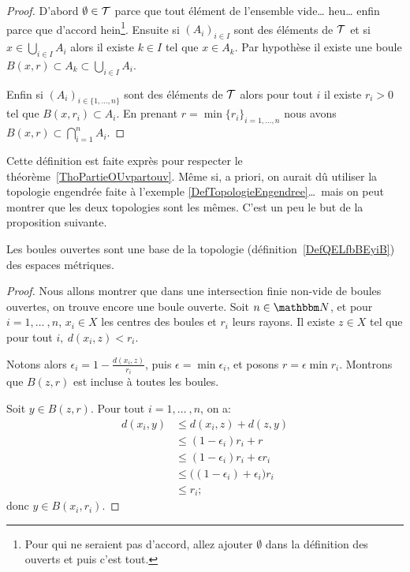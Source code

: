 \begin{proof}
    D'abord \( \emptyset\in\mathcal{T}\) parce que tout élément de l'ensemble vide\dots{} heu\dots{} enfin parce que d'accord hein\footnote{Pour qui ne seraient pas d'accord, allez ajouter \( \emptyset\) dans la définition des ouverts et puis c'est tout.}. Ensuite si \( (A_i)_{i\in I}\) sont des éléments de \( \mathcal{T}\) et si \( x\in\bigcup_{i\in I}A_i\) alors il existe \( k\in I\) tel que \( x\in A_k\). Par hypothèse il existe une boule \( B(x,r)\subset A_k\subset\bigcup_{i\in I}A_i\).

    Enfin si \( (A_i)_{i\in\{ 1,\ldots, n \}}\) sont des éléments de \( \mathcal{T}\) alors pour tout \( i\) il existe \( r_i>0\) tel que \( B(x,r_i)\subset A_i\). En prenant \( r=\min\{ r_i \}_{i=1,\ldots, n}\) nous avons $B(x,r)\subset\bigcap_{i=1}^nA_i.$
\end{proof}

\begin{remark}
  Cette définition est faite exprès pour respecter le théorème~\ref{ThoPartieOUvpartouv}. Même si, a priori, on aurait dû utiliser la topologie engendrée faite à l'exemple \ref{DefTopologieEngendree}\dots\ mais on peut montrer que les deux topologies sont les mêmes. C'est un peu le but de la proposition suivante.
\end{remark}

\begin{proposition}\label{PropBoulesBaseTopoMetrique}\label{ITEMooUIHJooXAFaIz}
      Les boules ouvertes sont une base de la topologie (définition~\ref{DefQELfbBEyiB}) des espaces métriques.
\end{proposition}

\begin{proof}
  Nous allons montrer que dans une intersection finie non-vide de boules ouvertes, on trouve encore une boule ouverte. Soit \( n \in \eN \), et pour \(i = 1,\ldots\ , n \), \(x_i \in X\) les centres des boules et \( r_i \) leurs rayons. Il existe \( z \in X \) tel que pour tout \(i,\ d(x_i,z) < r_i \).

  Notons alors \( \epsilon_i = 1 - \frac  { d(x_i,z)} {r_i} \), puis \(\epsilon = \min \epsilon_i \), et posons \( r = \epsilon \min r_i \). Montrons que \(B(z,r) \) est incluse à toutes les boules.

  Soit \( y \in B(z,r)\). Pour tout \(i = 1,\ldots\ , n\), on a:
  \begin{align}
    d(x_i,y)&\leq d(x_i,z) + d(z,y)\\
            &\leq (1 - \epsilon_i) r_i + r\\
            &\leq (1 - \epsilon_i) r_i + \epsilon r_i\\
            &\leq \bigl((1 - \epsilon_i) + \epsilon_i\bigr) r_i\\
            &\leq r_i;
  \end{align}
  donc \(y \in B(x_i, r_i)\).
\end{proof}

